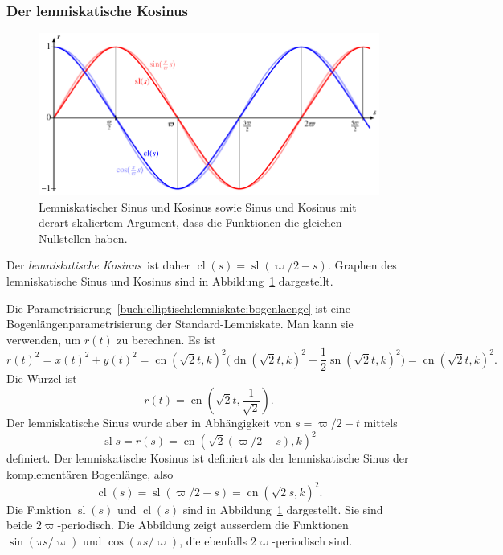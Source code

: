 \subsubsection{Der lemniskatische Kosinus}
\begin{figure}
\centering
\includegraphics[width=\textwidth]{chapters/110-elliptisch/images/slcl.pdf}
\caption{
Lemniskatischer Sinus und Kosinus sowie Sinus und Kosinus
mit derart skaliertem Argument, dass die Funktionen die
gleichen Nullstellen haben.
\label{buch:elliptisch:figure:slcl}}
\end{figure}
Der {\em lemniskatische Kosinus} ist daher
$\operatorname{cl}(s) = \operatorname{sl}(\varpi/2-s)$.
Graphen des lemniskatische Sinus und Kosinus sind in
Abbildung~\ref{buch:elliptisch:figure:slcl} dargestellt.

Die Parametrisierung~\eqref{buch:elliptisch:lemniskate:bogenlaenge}
ist eine Bogenlängenparametrisierung der Standard-Lemniskate.
Man kann sie verwenden, um $r(t)$ zu berechnen.
Es ist
\[
r(t)^2
=
x(t)^2 + y(t)^2
=
\operatorname{cn}(\sqrt{2}t,k)^2
\biggl(
\operatorname{dn}(\sqrt{2}t,k)^2
+
\frac12
\operatorname{sn}(\sqrt{2}t,k)^2
\biggr)
=
\operatorname{cn}(\sqrt{2}t,k)^2.
\]
Die Wurzel ist
\[
r(t)
=
\operatorname{cn}(\sqrt{2}t,{\textstyle\frac{1}{\sqrt{2}}})
.
\]
Der lemniskatische Sinus wurde aber in Abhängigkeit von
$s=\varpi/2-t$ mittels
\[
\operatorname{sl}s
=
r(s)
=
\operatorname{cn}(\sqrt{2}(\varpi/2-s),k)^2
\]
definiert.
Der lemniskatische Kosinus ist definiert als der lemniskatische Sinus
%
%
der komplementären Bogenlänge, also
\[
\operatorname{cl}(s)
=
\operatorname{sl}(\varpi/2-s)
=
\operatorname{cn}(\sqrt{2}s,k)^2.
\]
Die Funktion $\operatorname{sl}(s)$ und $\operatorname{cl}(s)$ sind
in Abbildung~\ref{buch:elliptisch:figure:slcl} dargestellt.
Sie sind beide $2\varpi$-periodisch.
Die Abbildung zeigt ausserdem die Funktionen $\sin (\pi s/\varpi)$
und $\cos(\pi s/\varpi)$, die ebenfalls $2\varpi$-periodisch sind.


